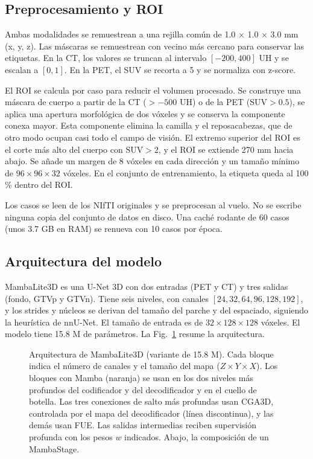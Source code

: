 \documentclass[conference]{IEEEtran}
\begin{document}
\subsection{Preprocesamiento y ROI}

Ambas modalidades se remuestrean a una rejilla común de 1.0 × 1.0 × 3.0 mm (x, y, z). Las máscaras se remuestrean con vecino más cercano para conservar las etiquetas. En la CT, los valores se truncan al intervalo $[-200, 400]$ UH y se escalan a $[0, 1]$. En la PET, el SUV se recorta a 5 y se normaliza con z-score.

El ROI se calcula por caso para reducir el volumen procesado. Se construye una máscara de cuerpo a partir de la CT ($> -500$ UH) o de la PET ($\mathrm{SUV} > 0.5$), se aplica una apertura morfológica de dos vóxeles y se conserva la componente conexa mayor. Esta componente elimina la camilla y el reposacabezas, que de otro modo ocupan casi todo el campo de visión. El extremo superior del ROI es el corte más alto del cuerpo con $\mathrm{SUV} > 2$, y el ROI se extiende 270 mm hacia abajo. Se añade un margen de 8 vóxeles en cada dirección y un tamaño mínimo de $96 \times 96 \times 32$ vóxeles. En el conjunto de entrenamiento, la etiqueta queda al 100 \% dentro del ROI.

Los casos se leen de los NIfTI originales y se preprocesan al vuelo. No se escribe ninguna copia del conjunto de datos en disco. Una caché rodante de 60 casos (unos 3.7 GB en RAM) se renueva con 10 casos por época.

\subsection{Arquitectura del modelo}

MambaLite3D es una U-Net 3D con dos entradas (PET y CT) y tres salidas (fondo, GTVp y GTVn). Tiene seis niveles, con canales $[24, 32, 64, 96, 128, 192]$, y los strides y núcleos se derivan del tamaño del parche y del espaciado, siguiendo la heurística de nnU-Net. El tamaño de entrada es de $32 \times 128 \times 128$ vóxeles. El modelo tiene 15.8 M de parámetros. La Fig.~\ref{fig:arquitectura} resume la arquitectura.

\begin{figure}[!t]
\centering
\resizebox{\textwidth}{!}{}
\caption{Arquitectura de MambaLite3D (variante de 15.8 M). Cada bloque indica el número de canales y el tamaño del mapa ($Z{\times}Y{\times}X$). Los bloques con Mamba (naranja) se usan en los dos niveles más profundos del codificador y del decodificador y en el cuello de botella. Las tres conexiones de salto más profundas usan CGA3D, controlada por el mapa del decodificador (línea discontinua), y las demás usan FUE. Las salidas intermedias reciben supervisión profunda con los pesos $w$ indicados. Abajo, la composición de un MambaStage.}
\label{fig:arquitectura}
\end{figure}
\end{document}
